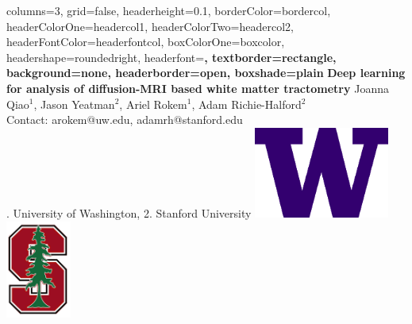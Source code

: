\documentclass[a0paper,landscape,fontscale=0.395]{baposter}
\begin{document}
\begin{poster}{
    columns=3,
    grid=false,
    headerheight=0.1\textheight,
    borderColor=bordercol, %
    headerColorOne=headercol1, %
    headerColorTwo=headercol2, %
    headerFontColor=headerfontcol, %
    boxColorOne=boxcolor, %
    headershape=roundedright, %
    headerfont=\Large\sf\bf, %
    textborder=rectangle,
    background=none,
    headerborder=open, %
    boxshade=plain
}
{}
%
%
{\sf\bf Deep learning for analysis of diffusion-MRI based white matter tractometry} %
{%
    \vspace{1em}
    Joanna Qiao{$^1$}, Jason Yeatman{$^2$}, Ariel Rokem{$^1$}, Adam Richie-Halford{$^2$}
    \\ Contact: arokem@uw.edu, adamrh@stanford.edu \hspace{0.5em} \null \\ %
    {. University of Washington, %
        2. Stanford University %
        \hfill %
    }
} %
{%
\includegraphics[align=c,height=3.00cm]{logos/UWlogo.png}%
\includegraphics[align=c,height=3.20cm]{logos/stanford_logo.png}%
} %
\vspace{-10em}


\end{poster}
\end{document}
